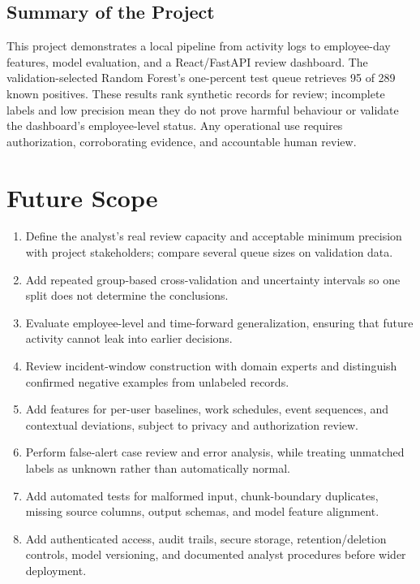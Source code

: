 \documentclass[12pt,a4paper,oneside]{report}
\begin{document}
\section{Summary of the Project}
This project demonstrates a local pipeline from activity logs to
employee-day features, model evaluation, and a React/FastAPI review
dashboard. The validation-selected Random Forest's one-percent test
queue retrieves 95 of 289 known positives. These results rank synthetic
records for review; incomplete labels and low precision mean they do not
prove harmful behaviour or validate the dashboard's employee-level
status. Any operational use requires authorization, corroborating
evidence, and accountable human review.

\chapter{Future Scope}
\begin{enumerate}
  \item Define the analyst's real review capacity and acceptable minimum
        precision with project stakeholders; compare several queue sizes
        on validation data.
  \item Add repeated group-based cross-validation and uncertainty
        intervals so one split does not determine the conclusions.
  \item Evaluate employee-level and time-forward generalization,
        ensuring that future activity cannot leak into earlier decisions.
  \item Review incident-window construction with domain experts and
        distinguish confirmed negative examples from unlabeled records.
  \item Add features for per-user baselines, work schedules, event
        sequences, and contextual deviations, subject to privacy and
        authorization review.
  \item Perform false-alert case review and error analysis, while
        treating unmatched labels as unknown rather than automatically
        normal.
  \item Add automated tests for malformed input, chunk-boundary
        duplicates, missing source columns, output schemas, and model
        feature alignment.
  \item Add authenticated access, audit trails, secure storage,
        retention/deletion controls, model versioning, and documented
        analyst procedures before wider deployment.
\end{enumerate}
\end{document}
